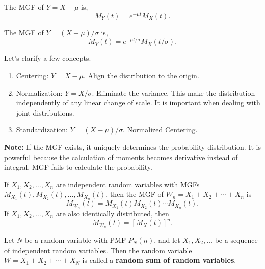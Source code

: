 \begin{corollary}
    The \textnormal{MGF} of $Y=X-\mu$ is,
    \[M_Y(t)=e^{-\mu t}M_X(t).\]
\end{corollary}

\begin{corollary}
    The \textnormal{MGF} of $Y=(X-\mu)/\sigma$ is,
    \[M_Y(t)=e^{-\mu t/\sigma}M_X(t/\sigma).\]
\end{corollary}

\begin{remark}
    Let's clarify a few concepts.
    \begin{enumerate}
        \item Centering: $Y=X-\mu$. Align the distribution to the origin.
        \item Normalization: $Y=X/\sigma$. Eliminate the variance. This make the distribution independently of any linear change of scale. It is important when dealing with joint distributions.
        \item Standardization: $Y=(X-\mu)/\sigma$. Normalized Centering.
    \end{enumerate}
\end{remark}

\textbf{Note:} If the \textnormal{MGF} exists, it uniquely determines the probability distribution. It is powerful because the calculation of moments becomes derivative instead of integral. \textnormal{MGF} fails to calculate the probability.

\begin{theorem}
    \label{thm:MGF_of_sum_of_independent_rv}
    If $X_1,X_2,\ldots,X_n$ are independent random variables with \textnormal{MGF}s $M_{X_1}(t),M_{X_2}(t),\ldots,M_{X_n}(t)$, then the \textnormal{MGF} of $W_n=X_1+X_2+\cdots+X_n$ is
    \[M_{W_n}(t)=M_{X_1}(t)M_{X_2}(t)\cdots M_{X_n}(t).\]
    If $X_1,X_2,\ldots,X_n$ are also identically distributed, then
    \[M_{W_n}(t)=\left[M_{X}(t)\right]^n.\]
\end{theorem}

\begin{definition}
    Let $N$ be a random variable with \textnormal{PMF} $P_N(n)$, and let $X_1,X_2,\ldots$ be a sequence of independent random variables. Then the random variable $W=X_1+X_2+\cdots+X_N$ is called a \textbf{random sum of \iid random variables}.
\end{definition}

